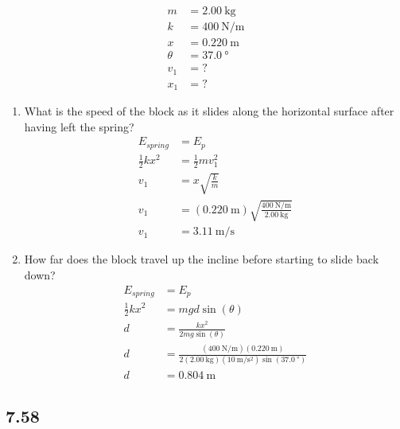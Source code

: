 \documentclass{article}
\begin{document}
\begin{align*}
	m & = \SI{2.00}{\kilogram} \\
	k & = \SI{400}{\newton \per \meter} \\
	x & = \SI{0.220}{\meter} \\
	\theta & = \SI{37.0}{\degree} \\
	v_1 & = ? \\
	x_1 & = ?
\end{align*}
\begin{enumerate}[label = \textbf{(\alph*)}]
	\item What is the speed of the block as it slides along the horizontal surface after having left the spring?
		\begin{align*}
			E_{spring} & = E_p \\
			\frac{1}{2}kx^2 & = \frac{1}{2}mv_1^2 \\
			v_1 & = x\sqrt{ \frac{k}{m} } \\
			v_1 & = (\SI{0.220}{\meter}) \sqrt{ \frac{\SI{400}{\newton \per \meter}}{\SI{2.00}{\kilogram}} } \\
			v_1 & = \SI{3.11}{\meter \per \second}
		\end{align*}
	\item How far does the block travel up the incline before starting to slide back down?
		\begin{align*}
			E_{spring} & = E_p \\
			\frac{1}{2}kx^2 & = mgd\sin(\theta) \\
			d & = \frac{kx^2}{2mg\sin(\theta)} \\
			d & = \frac{(\SI{400}{\newton \per \meter})(\SI{0.220}{\meter})}{2(\SI{2.00}{\kilogram})(\SI{10}{\meter \per \second \squared})\sin(\SI{37.0}{\degree})} \\
			d & = \SI{0.804}{\meter}
		\end{align*}
\end{enumerate}

\subsection{7.58}
\end{document}
